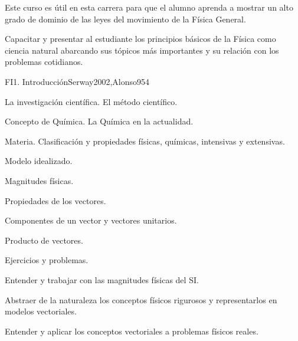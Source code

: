 \begin{syllabus}


\begin{justification}
Este curso es útil en esta carrera para que el alumno aprenda a mostrar un alto grado de dominio de las leyes del movimiento de la Física General.
\end{justification}

\begin{goals}
\item Capacitar y presentar al estudiante los principios básicos de la Física como ciencia natural abarcando sus tópicos más importantes y su relación con los problemas cotidianos.
\end{goals}

\begin{outcomes}
\end{outcomes}

\begin{unit}{FI1. Introducción}{Serway2002,Alonso95}{4}
\begin{topics}
      \item La investigación científica. El método científico.
      \item Concepto de Química. La Química en la actualidad.
      \item Materia. Clasificación y propiedades físicas, químicas, intensivas y extensivas.
      \item Modelo idealizado.
      \item Magnitudes físicas.
      \item Propiedades de los vectores.
      \item Componentes de un vector y vectores unitarios.
      \item Producto de vectores.
      \item Ejercicios y problemas.
   \end{topics}

   \begin{learningoutcomes}
      \item Entender y trabajar con las magnitudes físicas del SI.
      \item Abstraer de la naturaleza los conceptos físicos rigurosos y
      representarlos en modelos vectoriales.
      \item Entender y aplicar los conceptos vectoriales a problemas físicos reales.
   \end{learningoutcomes}
\end{unit}


\end{syllabus}
